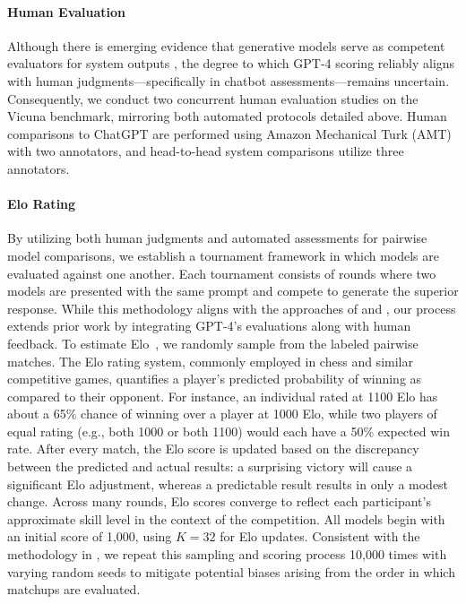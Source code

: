 \paragraph{Human Evaluation} Although there is emerging evidence that generative models serve as competent evaluators for system outputs \citep{fu2023gptscore}, the degree to which GPT-4 scoring reliably aligns with human judgments—specifically in chatbot assessments—remains uncertain. Consequently, we conduct two concurrent human evaluation studies on the Vicuna benchmark, mirroring both automated protocols detailed above. Human comparisons to ChatGPT are performed using Amazon Mechanical Turk (AMT) with two annotators, and head-to-head system comparisons utilize three annotators.

\paragraph{Elo Rating} By utilizing both human judgments and automated assessments for pairwise model comparisons, we establish a tournament framework in which models are evaluated against one another. Each tournament consists of rounds where two models are presented with the same prompt and compete to generate the superior response. While this methodology aligns with the approaches of \citet{bai2022training} and \citet{vicuna2023}, our process extends prior work by integrating GPT-4’s evaluations along with human feedback. To estimate Elo~\citep{elo1967proposed,elo1978rating}, we randomly sample from the labeled pairwise matches. The Elo rating system, commonly employed in chess and similar competitive games, quantifies a player's predicted probability of winning as compared to their opponent. For instance, an individual rated at 1100 Elo has about a 65\% chance of winning over a player at 1000 Elo, while two players of equal rating (e.g., both 1000 or both 1100) would each have a 50\% expected win rate. After every match, the Elo score is updated based on the discrepancy between the predicted and actual results: a surprising victory will cause a significant Elo adjustment, whereas a predictable result results in only a modest change. Across many rounds, Elo scores converge to reflect each participant’s approximate skill level in the context of the competition. All models begin with an initial score of 1,000, using $K=32$ for Elo updates. Consistent with the methodology in \citet{vicuna2023}, we repeat this sampling and scoring process 10,000 times with varying random seeds to mitigate potential biases arising from the order in which matchups are evaluated.

